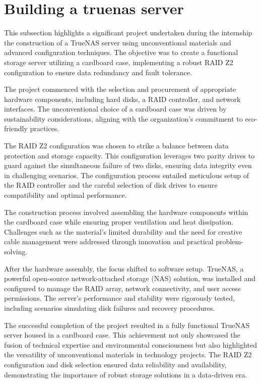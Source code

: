 \section{Building a truenas server}
This subsection highlights a significant project undertaken during the internship the construction of a TrueNAS server using unconventional materials and advanced configuration techniques. The objective was to create a functional storage server utilizing a cardboard case, implementing a robust RAID Z2 configuration to ensure data redundancy and fault tolerance.

The project commenced with the selection and procurement of appropriate hardware components, including hard disks, a RAID controller, and network interfaces. The unconventional choice of a cardboard case was driven by sustainability considerations, aligning with the organization's commitment to eco-friendly practices.

The RAID Z2 configuration was chosen to strike a balance between data protection and storage capacity. This configuration leverages two parity drives to guard against the simultaneous failure of two disks, ensuring data integrity even in challenging scenarios. The configuration process entailed meticulous setup of the RAID controller and the careful selection of disk drives to ensure compatibility and optimal performance.

The construction process involved assembling the hardware components within the cardboard case while ensuring proper ventilation and heat dissipation. Challenges such as the material's limited durability and the need for creative cable management were addressed through innovation and practical problem-solving.

After the hardware assembly, the focus shifted to software setup. TrueNAS, a powerful open-source network-attached storage (NAS) solution, was installed and configured to manage the RAID array, network connectivity, and user access permissions. The server's performance and stability were rigorously tested, including scenarios simulating disk failures and recovery procedures.

The successful completion of the project resulted in a fully functional TrueNAS server housed in a cardboard case. This achievement not only showcased the fusion of technical expertise and environmental consciousness but also highlighted the versatility of unconventional materials in technology projects. The RAID Z2 configuration and disk selection ensured data reliability and availability, demonstrating the importance of robust storage solutions in a data-driven era.

